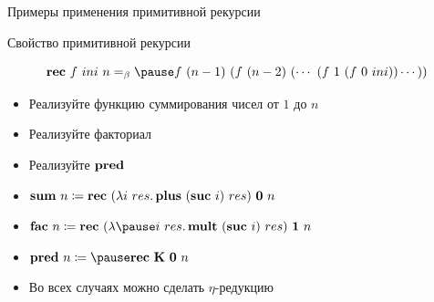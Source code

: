     \begin{frame}[fragile]{Примеры применения примитивной рекурсии}
        \begin{block}{Свойство примитивной рекурсии}
            \vspace{-0.5em}

            \[\term{rec}~f~ini~n \eqbeta \pause f~(n-1)~(f~(n-2)~(\cdots~(f~1~(f~0~ini))\cdots))\]

            \vspace{-1.5em}
        \end{block}
        \vspace{1em}
        \begin{itemize}
            \item[\todo] Реализуйте функцию суммирования чисел от $1$ до $n$
            \item[\todo] Реализуйте факториал
            \item[\todo] Реализуйте $\mathbf{pred}$
            \item[\answer] \pause $\mathbf{sum} ~ n \coloneqq \mathbf{rec} ~ (\lambda i ~ res \ldotp \mathbf{plus} ~ (\mathbf{suc} ~ i) ~ res) ~ \mathbf{0} ~ n$
            \item[\answer] \pause $\term{fac} \ap n
            \termdef
            \term{rec}
            \ap (\lambda \pause i \ap res \ldotp \term{mult} \ap (\term{suc} \ap i) \ap res)
            \ap \term{1} \ap n$
            \item[\answer] $\term{pred} \ap n \termdef \pause \term{rec}~\term{K}~\term{0} \ap n$
            \item Во всех случаях можно сделать $\eta$-редукцию
        \end{itemize}
    \end{frame}

